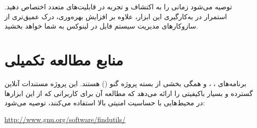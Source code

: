 توصیه می‌شود زمانی را به اکتشاف و تجربه در قابلیت‌های متعدد  اختصاص دهید. استمرار در به‌کارگیری این ابزار، علاوه بر افزایش بهره‌وری، درک عمیق‌تری از سازوکارهای مدیریت سیستم فایل در لینوکس به شما خواهد بخشید.

\section{منابع مطالعه تکمیلی}

برنامه‌های ، ،  و  همگی بخشی از بسته  پروژه گنو () هستند. این پروژه مستندات آنلاین گسترده و بسیار باکیفیتی را ارائه می‌دهد که مطالعه آن برای کاربرانی که از این ابزارها در محیط‌هایی با حساسیت امنیتی بالا استفاده می‌کنند، توصیه می‌شود:

\begin{latin}
\url{http://www.gnu.org/software/findutils/}
\end{latin}